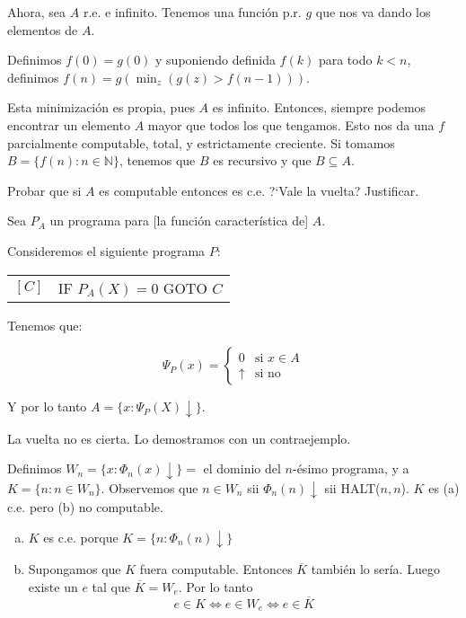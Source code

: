 \begin{questions}
\begin{solution}
 Ahora, sea $A$ r.e. e infinito. Tenemos una funci\'on p.r. $g$ que nos va dando los elementos de $A$. 
 
 Definimos $f(0) = g(0)$ y suponiendo definida $f(k)$ para todo $k<n$, definimos $f(n) = g(\min_z(g(z)>f(n-1)))$.
 
 Esta minimizaci\'on es propia, pues $A$ es infinito. Entonces, siempre podemos encontrar un elemento $A$ mayor que todos los que tengamos. Esto nos da una $f$ parcialmente computable, total, y estrictamente creciente. Si tomamos $B=\{f(n) : n \in \mathbb{N}\}$, tenemos que $B$ es recursivo y que $B\subseteq A$. 
\end{solution}

\question Probar que si $A$ es computable entonces es c.e. ?`Vale la vuelta? Justificar.

\begin{solution}
 Sea $P_A$ un programa para [la funci\'on caracter\'istica de] $A$. 
 
 Consideremos el siguiente programa $P$: 
 
 \vspace{0.5cm}
  \begin{tabular}{rl}
    $[C]$ & IF $P_A(X)=0$ GOTO $C$ \\
  \end{tabular}
 \vspace{0.5cm}
 
 Tenemos que: 
 
  \begin{equation*}
    \Psi_P(x) = \left\{ \begin{matrix} 
      0 & \text{si } x\in A \\ 
      \uparrow & \text{si no}
    \end{matrix} \right.
  \end{equation*}

 Y por lo tanto $A = \{x : \Psi_P(X)\downarrow\}$. 
 
 La vuelta no es cierta. Lo demostramos con un contraejemplo. 
 
 Definimos $W_n=\{ x : \Phi_n(x)\downarrow\} = $ el dominio del $n$-\'esimo programa, y a $K=\{n : n\in W_n\}$. Observemos que $n\in W_n$ sii $\Phi_n(n)\downarrow$ sii HALT($n,n$). $K$ es (a) c.e. pero (b) no computable. 
 
 \begin{enumerate}[(a)]
 \item $K$ es c.e. porque $K=\{n : \Phi_n(n)\downarrow\}$
 \item Supongamos que $K$ fuera computable. Entonces $\overline{K}$ tambi\'en lo ser\'ia. Luego existe un $e$ tal que $\overline{K}=W_e$. Por lo tanto
 \begin{equation*}
  e \in K \Leftrightarrow e \in W_e \Leftrightarrow e\in \overline{K}
 \end{equation*}


\end{enumerate}
\end{solution}
\end{questions}

